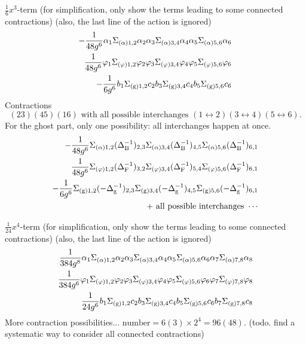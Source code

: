 $\frac{1}{6}x^3$-term (for simplification, only show the terms leading to some connected contractions)
(also, the last line of the action is ignored)
\begin{align*}
	- \frac{1}{48 g^6} \alpha_1 \Sigma_{(\alpha)1,2} \alpha_2
	\alpha_3 \Sigma_{(\alpha)3,4} \alpha_4
	\alpha_5 \Sigma_{(\alpha)5,6} \alpha_6 \notag\\
	\frac{1}{48 g^6} \varphi_1 \Sigma_{(\varphi)1,2} \varphi_2
	\varphi_3 \Sigma_{(\varphi)3,4} \varphi_4
	\varphi_5 \Sigma_{(\varphi)5,6} \varphi_6 \notag \\
	- \frac{1}{6 g^6} b_1 \Sigma_{(\text{g})1,2} c_2
	b_3 \Sigma_{(\text{g})3,4} c_4
	b_5 \Sigma_{(\text{g})5,6} c_6
\end{align*}
Contractions
\[
	(23)(45)(16) \text{ with all possible interchanges }
	(1 \leftrightarrow 2)(3 \leftrightarrow 4)(5 \leftrightarrow 6)
.\] 
For the ghost part, only one possibility: all interchanges happen at once.
\begin{align*}
	- \frac{1}{48 g^6} \Sigma_{(\alpha)1,2} (\Delta_{\mathrm{B}}^{-1})_{2,3}
	\Sigma_{(\alpha)3,4} (\Delta_{\mathrm{B}}^{-1})_{4,5}
	\Sigma_{(\alpha)5,6} (\Delta_{\mathrm{B}}^{-1})_{6,1}\notag\\
	\frac{1}{48 g^6} \Sigma_{(\varphi)1,2} (\Delta_{\mathrm{F}}^{-1})_{3,2}
	\Sigma_{(\varphi)3,4}(\Delta_{\mathrm{F}}^{-1})_{5,4}
	\Sigma_{(\varphi)5,6} (\Delta_{\mathrm{F}}^{-1})_{6,1} \notag\\
	-\frac{1}{6g^6}\Sigma_{(\text{g})1,2} (-\Delta_{\mathrm{g}}^{-1})_{2,3}
	\Sigma_{(\text{g})3,4}(-\Delta_{\mathrm{g}}^{-1})_{4,5}
	\Sigma_{(\text{g})5,6}(-\Delta_{\mathrm{g}}^{-1})_{6,1}\notag\\
	+ \text{ all possible interchanges } \cdots
\end{align*}

$\frac{1}{24}x^4$-term (for simplification, only show the terms leading to some connected contractions)
(also, the last line of the action is ignored)
\begin{align*}
	\frac{1}{384 g^8} \alpha_1 \Sigma_{(\alpha)1,2} \alpha_2
	\alpha_3 \Sigma_{(\alpha)3,4} \alpha_4
	\alpha_5 \Sigma_{(\alpha)5,6} \alpha_6 
	\alpha_7 \Sigma_{(\alpha)7,8} \alpha_8\notag\\
	\frac{1}{384 g^6} \varphi_1 \Sigma_{(\varphi)1,2} \varphi_2
	\varphi_3 \Sigma_{(\varphi)3,4} \varphi_4
	\varphi_5 \Sigma_{(\varphi)5,6} \varphi_6 
	\varphi_7 \Sigma_{(\varphi)7,8} \varphi_8\notag \\
	\frac{1}{24 g^6} b_1 \Sigma_{(\text{g})1,2} c_2
	b_3 \Sigma_{(\text{g})3,4} c_4
	b_5 \Sigma_{(\text{g})5,6} c_6
	b_7 \Sigma_{(\text{g})7,8} c_8
\end{align*}
More contraction possibilities...
$\text{number}=6(3)\times 2^4 = 96(48)$.
(todo. find a systematic way to consider all connected contractions)

